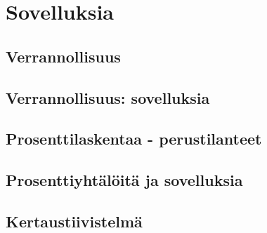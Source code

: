 %
\part{Sovelluksia}
%
%
\chapter{Verrannollisuus}
\chapter{Verrannollisuus: sovelluksia}
\chapter{Prosenttilaskentaa - perustilanteet}
\chapter{Prosenttiyhtälöitä ja sovelluksia}
%
%
\chapter{Kertaustiivistelmä}
